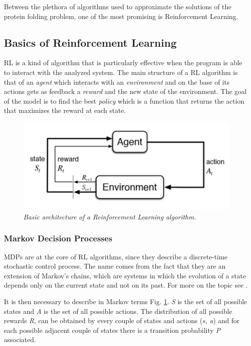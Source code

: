 Between the plethora of algorithms used to approximate the solutions of the protein folding problem, one of the most promising is Reinforcement Learning.

\subsection{Basics of Reinforcement Learning} \label{BRL}

RL is a kind of algorithm that is particularly effective when the program is able to interact with the analyzed system.
The main structure of a RL algorithm is that of an \emph{agent} which interacts with an \emph{environment} and on the base of its actions gets as feedback a \emph{reward} and the new state of the environment.
The goal of the model is to find the best \emph{policy} which is a function that returns the action that maximizes the reward at each state.


\begin{figure}[H]
    \centering
    \includegraphics[width=.75\textwidth]{img/rl0.png}
    \caption{\emph{Basic architecture of a Reinforcement Learning algorithm.}}
    \label{fig:rl0}
\end{figure}

\subsubsection{Markov Decision Processes}

MDPs are at the core of RL algorithms, since they describe a discrete-time stochastic control process.
The name comes from the fact that they are an extension of Markov's chains, which are systems in which the evolution of a state depends only on the current state and not on its past.
For more on the topic see \cite{bellman1957markovian}.


It is then necessary to describe in Markov terms Fig. \ref{fig:rl0}.
\emph{S} is the set of all possible states and \emph{A} is the set of all possible actions.
The distribution of all possible rewards \emph{R}, can be obtained by every couple of states and actions (\emph{s, a}) and for each possible adjacent couple of states there is a transition probability \emph{P} associated.


